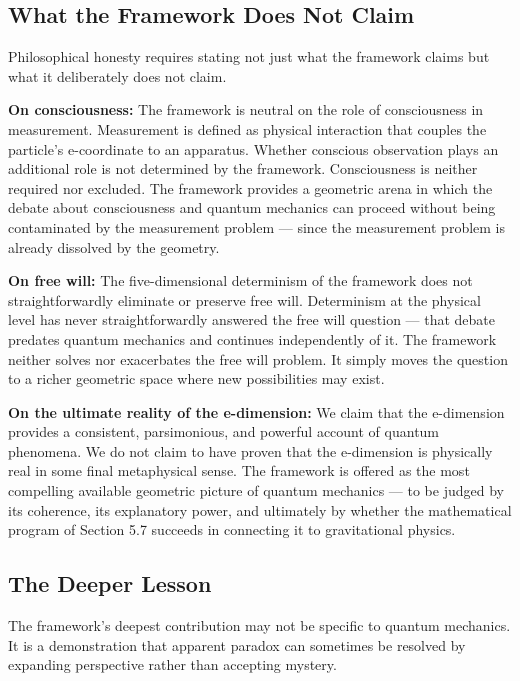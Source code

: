 \documentclass[aps,prd,preprint,superscriptaddress,longbibliography,floatfix]{revtex4-2}
\theoremstyle{remark}
\begin{document}
\subsection{What the Framework Does Not Claim}

Philosophical honesty requires stating not just what the framework claims but what it deliberately does not claim.

\textbf{On consciousness:} The framework is neutral on the role of consciousness in measurement. Measurement is defined as physical interaction that couples the particle's e-coordinate to an apparatus. Whether conscious observation plays an additional role is not determined by the framework. Consciousness is neither required nor excluded. The framework provides a geometric arena in which the debate about consciousness and quantum mechanics can proceed without being contaminated by the measurement problem --- since the measurement problem is already dissolved by the geometry.

\textbf{On free will:} The five-dimensional determinism of the framework does not straightforwardly eliminate or preserve free will. Determinism at the physical level has never straightforwardly answered the free will question --- that debate predates quantum mechanics and continues independently of it. The framework neither solves nor exacerbates the free will problem. It simply moves the question to a richer geometric space where new possibilities may exist.

\textbf{On the ultimate reality of the e-dimension:} We claim that the e-dimension provides a consistent, parsimonious, and powerful account of quantum phenomena. We do not claim to have proven that the e-dimension is physically real in some final metaphysical sense. The framework is offered as the most compelling available geometric picture of quantum mechanics --- to be judged by its coherence, its explanatory power, and ultimately by whether the mathematical program of Section 5.7 succeeds in connecting it to gravitational physics.



\subsection{The Deeper Lesson}

The framework's deepest contribution may not be specific to quantum mechanics. It is a demonstration that apparent paradox can sometimes be resolved by expanding perspective rather than accepting mystery.
\end{document}
